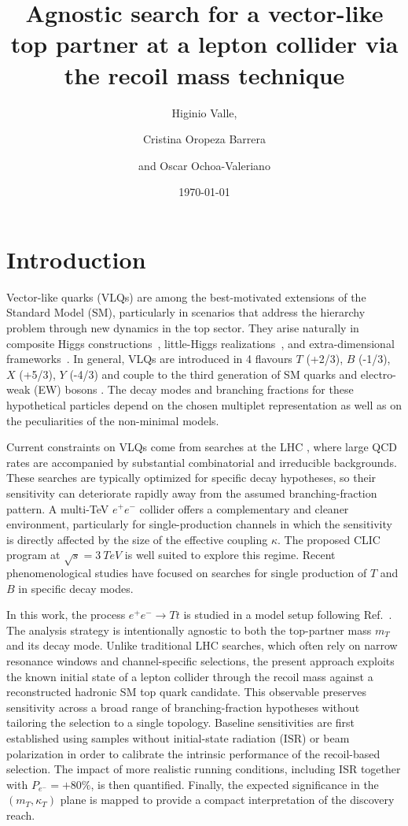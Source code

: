 \documentclass[a4paper,11pt]{article}
\title{Agnostic search for a vector-like top partner at a lepton collider via the recoil mass technique}
\author{Higinio Valle,}
\author[1]{Cristina Oropeza Barrera\note{Corresponding author.}}
\author{and Oscar Ochoa-Valeriano}
\affiliation{Universidad Iberoamericana Ciudad de México, \\ Prolongación Paseo de la Reforma 880, Col. Lomas de Santa Fe, Álvaro Obregón, Mexico City 01219, Mexico}
\date{\today}
\begin{document}
\maketitle
\flushbottom
\section{Introduction}

Vector-like quarks (VLQs) are among the best-motivated extensions of the Standard Model (SM), particularly in scenarios that address the hierarchy problem \cite{hierarchy} through new dynamics in the top sector. They arise naturally in composite Higgs constructions~\cite{composite_vector_resonances, composite-Higgs_minimal, composite-Higgs_phenomenology}, little-Higgs realizations~\cite{little-Higgs}, and extra-dimensional frameworks~\cite{Antoniadis:1990}. In general, VLQs are introduced in 4 flavours $T$ (+2/3), $B$ (-1/3), $X$ (+5/3), $Y$ (-4/3) and couple to the third generation of SM quarks and electro-weak (EW) bosons \cite{VLQ_handbook}. The decay modes and branching fractions for these hypothetical particles depend on the chosen multiplet representation as well as on the peculiarities of the non-minimal models.
 
Current constraints on VLQs come from searches at the LHC \cite{CMS_review, ATLAS_review}, where large QCD rates are accompanied by substantial combinatorial and irreducible backgrounds. These searches are typically optimized for specific decay hypotheses, so their sensitivity can deteriorate rapidly away from the assumed branching-fraction pattern. A multi-TeV $e^{+}e^{-}$ collider offers a complementary and cleaner environment, particularly for single-production channels in which the sensitivity is directly affected by the size of the effective coupling $\kappa$. The proposed CLIC program \cite{brunner2022clicproject} at $\sqrt{s}=\SI{3}{TeV}$ is well suited to explore this regime. Recent phenomenological studies have focused on searches for single production of $T$ \cite{TCLICsearch} and $B$ \cite{BCLICsearch} in specific decay modes.

In this work, the process $e^{+}e^{-}\to T t$ is studied in a model setup following Ref.~\cite{Buchkremer:2013}. The analysis strategy is intentionally agnostic to both the top-partner mass $m_T$ and its decay mode. Unlike traditional LHC searches, which often rely on narrow resonance windows and channel-specific selections, the present approach exploits the known initial state of a lepton collider through the recoil mass against a reconstructed hadronic SM top quark candidate. This observable preserves sensitivity across a broad range of branching-fraction hypotheses without tailoring the selection to a single topology. Baseline sensitivities are first established using samples without initial-state radiation (ISR) or beam polarization in order to calibrate the intrinsic performance of the recoil-based selection. The impact of more realistic running conditions, including ISR together with $P_{e^-}=+80\%$, is then quantified. Finally, the expected significance in the $(m_T,\kappa_T)$ plane is mapped to provide a compact interpretation of the discovery reach.
\end{document}
